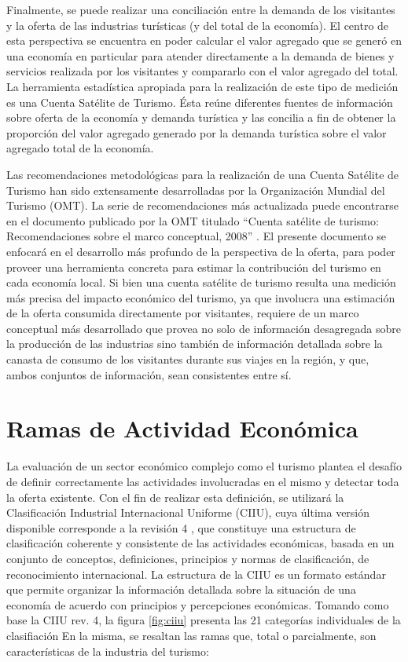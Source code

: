 \documentclass[
  openany]{book}
\begin{document}
Finalmente, se puede realizar una conciliación entre la demanda de los visitantes y la oferta de las industrias turísticas (y del total de la economía). El centro de esta perspectiva se encuentra en poder calcular el valor agregado que se generó en una economía en particular para atender directamente a la demanda de bienes y servicios realizada por los visitantes y compararlo con el valor agregado del total. La herramienta estadística apropiada para la realización de este tipo de medición es una Cuenta Satélite de Turismo. Ésta reúne diferentes fuentes de información sobre oferta de la economía y demanda turística y las concilia a fin de obtener la proporción del valor agregado generado por la demanda turística sobre el valor agregado total de la economía.

Las recomendaciones metodológicas para la realización de una Cuenta Satélite de Turismo han sido extensamente desarrolladas por la Organización Mundial del Turismo (OMT). La serie de recomendaciones más actualizada puede encontrarse en el documento publicado por la OMT titulado ``Cuenta satélite de turismo: Recomendaciones sobre el marco conceptual, 2008'' \citep{cstrmc2008}. El presente documento se enfocará en el desarrollo más profundo de la perspectiva de la oferta, para poder proveer una herramienta concreta para estimar la contribución del turismo en cada economía local. Si bien una cuenta satélite de turismo resulta una medición más precisa del impacto económico del turismo, ya que involucra una estimación de la oferta consumida directamente por visitantes, requiere de un marco conceptual más desarrollado que provea no solo de información desagregada sobre la producción de las industrias sino también de información detallada sobre la canasta de consumo de los visitantes durante sus viajes en la región, y que, ambos conjuntos de información, sean consistentes entre sí.

\hypertarget{ramas-de-actividad-econuxf3mica}{%
\section{Ramas de Actividad Económica}\label{ramas-de-actividad-econuxf3mica}}

La evaluación de un sector económico complejo como el turismo plantea el desafío de definir correctamente las actividades involucradas en el mismo y detectar toda la oferta existente. Con el fin de realizar esta definición, se utilizará la Clasificación Industrial Internacional Uniforme (CIIU), cuya última versión disponible corresponde a la revisión 4 \citep{ciiurev4}, que constituye una estructura de clasificación coherente y consistente de las actividades económicas, basada en un conjunto de conceptos, definiciones, principios y normas de clasificación, de reconocimiento internacional. La estructura de la CIIU es un formato estándar que permite organizar la información detallada sobre la situación de una economía de acuerdo con principios y percepciones económicas. Tomando como base la CIIU rev. 4, la figura \ref{fig:ciiu} presenta las 21 categorías individuales de la clasifiación En la misma, se resaltan las ramas que, total o parcialmente, son características de la industria del turismo:
\end{document}
